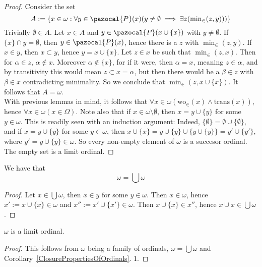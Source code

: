\begin{proof}
    Consider the set 
    $$A := \{x\in \omega : \forall y\in \pazocal{P}(x)(y\neq \emptyset\implies \exists z(\textstyle{\min}_\in(z,y)))\}$$ 
    Trivially $\emptyset \in A$. Let $x\in A$ and $y\in \pazocal{P}(x\cup\{x\})$ with $y\neq \emptyset$. If $\{x\}\cap y=\emptyset$, then $y\in\pazocal{P}(x)$, hence there is a $z$ with $\min_\in(z,y)$. If $x\in y$, then $x\subset y$, hence $y= x\cup \{x\}$. Let $z\in x$ be such that $\min_\in(z,x)$. Then for $\alpha\in z$, $\alpha\notin x$. Moreover $\alpha\notin\{x\}$, for if it were, then $\alpha=x$, meaning $z\in \alpha$, and by transitivity this would mean $z\subset x=\alpha$, but then there would be a $\beta \in z$ with $\beta\in x$ contradicting minimality. So we conclude that $\min_\in(z,x\cup\{x\})$. It follows that $A = \omega$.\\
    With previous lemmas in mind, it follows that $\forall x\in \omega(\mathrm{wo}_\in(x) \wedge \mathrm{trans}(x))$, hence $\forall x\in \omega(x\in \Omega)$. Note also that if $x\in \omega\setminus \emptyset$, then $x = y\cup\{y\}$ for some $y\in \omega$. This is readily seen with an induction argument: Indeed, $\{\emptyset\}=\emptyset \cup\{\emptyset\}$, and if $x = y\cup\{y\}$ for some $y\in \omega$, then $x\cup \{x\} = y\cup\{y\} \cup \{y\cup\{y\}\} = y' \cup\{y'\}$, where $y' = y\cup\{y\}\in \omega$. So every non-empty element of $\omega$ is a succesor ordinal. The empty set is a limit ordinal. 
\end{proof}
\begin{lemma}
    We have that 
    $$\omega = \bigcup \omega$$
\end{lemma}
\begin{proof}
    Let $x\in\bigcup \omega$, then $x\in y$ for some $y\in \omega$. Then $x\in \omega$, hence $x' := x\cup\{x\}\in \omega$ and $x'':= x'\cup\{x'\}\in \omega$. Then $x\cup\{x\}\in x''$, hence $x\cup x \in \bigcup \omega$.
\end{proof}
\begin{proposition}
    $\omega$ is a limit ordinal.
\end{proposition}
\begin{proof}
    This follows from $\omega$ being a family of ordinals, $\omega = \bigcup \omega$ and Corollary~\ref{ClosurePropertiesOfOrdinals}. 1. 
\end{proof}
